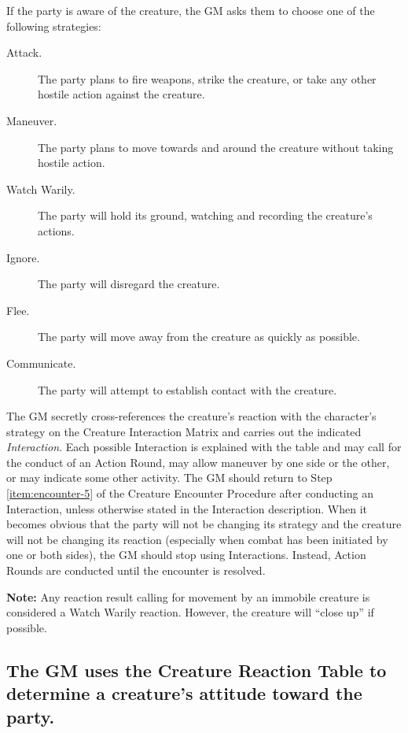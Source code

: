 If the party is aware of the creature, the GM asks them to choose one
of the following strategies:

\begin{description}
\item[Attack.] The party plans to fire weapons, strike the creature,
  or take any other hostile action against the creature.
\item[Maneuver.]The party plans to move towards and around the
  creature without taking hostile action.
\item[Watch Warily.] The party will hold its ground, watching and
  recording the creature's actions.
\item[Ignore.] The party will disregard the creature.
\item[Flee.] The party will move away from the creature as quickly as
  possible.
\item[Communicate.]The party will attempt to establish contact with
  the creature.
\end{description}

The GM secretly cross-references the creature's reaction with the
character's strategy on the Creature Interaction Matrix and carries
out the indicated \emph{Interaction}. Each possible Interaction is
explained with the table and may call for the conduct of an Action
Round, may allow maneuver by one side or the other, or may indicate
some other activity. The GM should return to Step \ref{item:encounter-5} of the Creature
Encounter Procedure after conducting an Interaction, unless otherwise
stated in the Interaction description. When it becomes obvious that
the party will not be changing its strategy and the creature will not
be changing its reaction (especially when combat has been initiated by
one or both sides), the GM should stop using Interactions. Instead,
Action Rounds are conducted until the encounter is resolved.

\textbf{Note:} Any reaction result calling for movement by an immobile
creature is considered a Watch Warily reaction. However, the creature
will ``close up'' if possible.


\subsection[Creature Reaction Table]{The GM uses the Creature Reaction
  Table to determine a 
  creature's attitude toward the party.}
\label{sec:creature-reaction-table}



